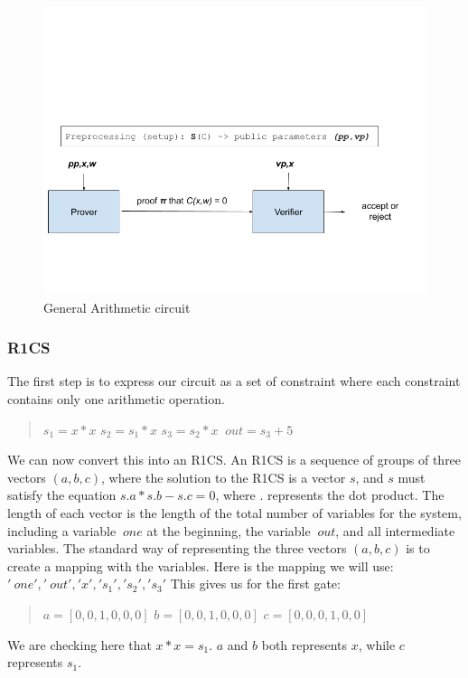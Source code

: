 \begin{figure}[H]
   \centering
   \includegraphics[width=130mm]{ArithmeticCircuit.png}
   \caption{General Arithmetic circuit}
   \label{overflow}
   \end{figure}

   \subsubsection{R1CS}
   The first step is to express our circuit as a set of constraint where each constraint contains only one arithmetic operation.
   \begin{quote}
   $s_1 = x * x$
   $s_2 = s_1 * x$
   $s_3 = s_2 * x$
   $~out = s_3 + 5$
   \end{quote}

   We can now convert this into an R1CS.
   An R1CS is a sequence of groups of three vectors $(a, b, c)$, where the solution to the R1CS is a vector $s$, and $s$ must satisfy the equation $s . a * s . b - s . c = 0$, where $.$ represents the dot product.
   The length of each vector is the length of the total number of variables for the system, including a variable $~one$ at the beginning, the variable $~out$, and all intermediate variables.
   The standard way of representing the three vectors $(a, b, c)$ is to create a mapping with the variables.
   Here is the mapping we will use:
   $'~one', '~out', 'x','s_1','s_2','s_3'$
   This gives us for the first gate:
   \begin{quote}
      $a = [0,0,1,0,0,0]$
      $b = [0,0,1,0,0,0]$
      $c = [0,0,0,1,0,0]$
   \end{quote}
   We are checking here that $x*x=s_1$.
   $a$ and $b$ both represents $x$, while $c$ represents $s_1$.

